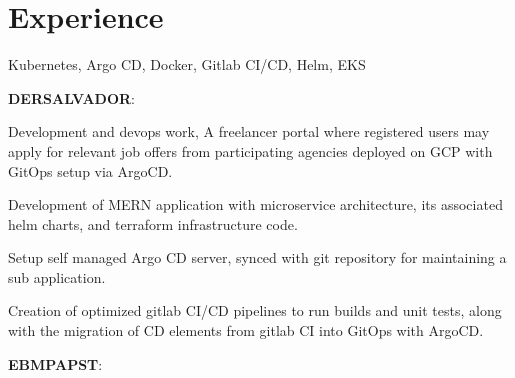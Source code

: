 \documentclass[]{font}
\begin{document}
\begin{minipage}[t]{0.66\textwidth} 


\section{Experience}


Kubernetes, Argo CD, Docker, Gitlab CI/CD, Helm, EKS
\vspace{\topsep}

\textbf{DERSALVADOR}:
\vspace{\topsep}

\begin{tightemize}
\item Development and devops work, A freelancer portal where registered users may apply for relevant job offers from participating agencies deployed on GCP with GitOps setup via ArgoCD.
\item Development of MERN application with microservice architecture, its associated helm charts, and terraform infrastructure code.
\item Setup self managed Argo CD server, synced with git repository for maintaining a sub application.
\item Creation of optimized gitlab CI/CD pipelines to run builds and unit tests, along with the migration of CD elements from gitlab CI into GitOps with ArgoCD.
\end{tightemize}

\vspace{\topsep}
\textbf{EBMPAPST}:


\end{minipage}
\end{document}
